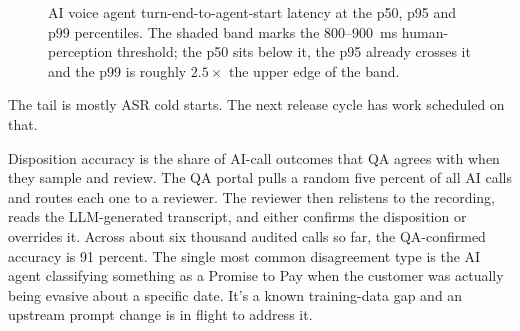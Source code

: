 \begin{figure}[H]
\centering
{}
\caption{AI voice agent turn-end-to-agent-start latency at the p50, p95 and p99 percentiles. The shaded band marks the 800--900~ms human-perception threshold; the p50 sits below it, the p95 already crosses it and the p99 is roughly $2.5\times$ the upper edge of the band.}
\label{fig:voice-latency}
\end{figure}

The tail is mostly ASR cold starts. The next release cycle has work scheduled on that.

Disposition accuracy is the share of AI-call outcomes that QA agrees with when they sample and review. The QA portal pulls a random five percent of all AI calls and routes each one to a reviewer. The reviewer then relistens to the recording, reads the LLM-generated transcript, and either confirms the disposition or overrides it. Across about six thousand audited calls so far, the QA-confirmed accuracy is 91 percent. The single most common disagreement type is the AI agent classifying something as a Promise to Pay when the customer was actually being evasive about a specific date. It's a known training-data gap and an upstream prompt change is in flight to address it.


